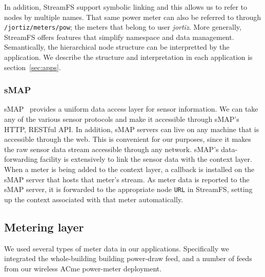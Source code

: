 In addition, StreamFS support symbolic linking and this allows us to refer to nodes by multiple names.  That same 
power meter can also be referred to through {\tt /jortiz/meters/pow}; the meters that belong to user \emph{jortiz}.
More generally, StreamFS offers features that simplify namespace and data management.  Semantically, the hierarchical
node structure can be interpretted by the application.  We describe the structure and interpretation in
each application is section~\ref{sec:apps}.

\subsubsection{sMAP}
\label{sec:smap}
sMAP~\cite{smap} provides a uniform data access layer for sensor information.  We can take any of the various sensor protocols
and make it accessible through sMAP's HTTP, RESTful API.  In addition, sMAP servers can live on any machine that is accessible
through the web.  This is convenient for our purposes, since it makes the raw sensor data stream accessible through any network.
sMAP's data-forwarding facility is extensively to link the sensor data with the context layer.  When a meter is being added
to the context layer, a callback is installed on the sMAP server that hosts that meter's stream.  As meter data is reported 
to the sMAP server, it is forwarded to the appropriate node {\tt URL} in StreamFS, setting up the context associated with that
meter automatically.

\subsection{Metering layer}
We used several types of meter data in our applications.  Specifically we integrated the whole-building building power-draw feed,
and a number of feeds from our wireless ACme power-meter deployment.

